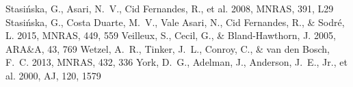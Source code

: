\documentclass[twocolumn]{aastex631}
\begin{document}
\begin{thebibliography}{}
 Stasi{\'n}ska, G., Asari, N.~V., Cid Fernandes, R., et al. 2008, MNRAS, 391, L29
 Stasi{\'n}ska, G., Costa Duarte, M.~V., Vale Asari, N., Cid Fernandes, R., \& Sodr{\'e}, L. 2015, MNRAS, 449, 559
 Veilleux, S., Cecil, G., \& Bland-Hawthorn, J. 2005, ARA\&A, 43, 769
 Wetzel, A.~R., Tinker, J.~L., Conroy, C., \& van den Bosch, F.~C. 2013, MNRAS, 432, 336
 York, D.~G., Adelman, J., Anderson, J.~E., Jr., et al. 2000, AJ, 120, 1579
\end{thebibliography}
\end{document}
